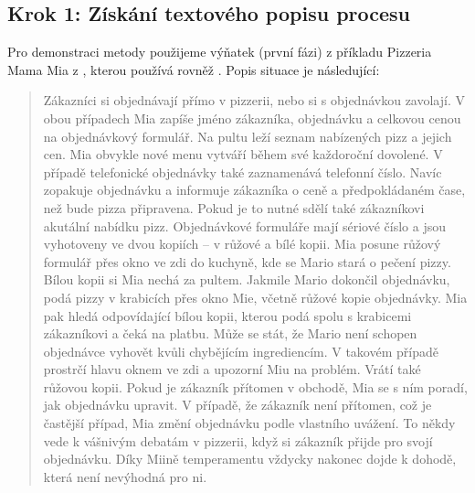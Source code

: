 \documentclass[]{article}
\begin{document}
\subsection{Krok 1: Získání textového popisu procesu}
Pro demonstraci metody použijeme výňatek (první fázi) z příkladu Pizzeria Mama Mia z \cite{Dietz2006}, kterou používá rovněž \cite{VanNuffel2009}. Popis situace je následující:
\begin{quote}
Zákazníci si objednávají přímo v pizzerii, nebo si s objednávkou zavolají. V obou případech Mia zapíše jméno zákazníka, objednávku a celkovou cenou na objednávkový formulář. Na pultu leží seznam nabízených pizz a jejich cen. Mia obvykle nové menu vytváří během své každoroční dovolené. V případě telefonické objednávky také zaznamenává telefonní číslo. Navíc zopakuje objednávku a informuje zákazníka o ceně a předpokládaném čase, než bude pizza připravena. Pokud je to nutné sdělí také zákazníkovi akutální nabídku pizz. Objednávkové formuláře mají sériové číslo a jsou vyhotoveny ve dvou kopiích – v růžové a bílé kopii. Mia posune růžový formulář přes okno ve zdi do kuchyně, kde se Mario stará o pečení pizzy. Bílou kopii si Mia nechá za pultem. Jakmile Mario dokončil objednávku, podá pizzy v krabicích přes okno Mie, včetně růžové kopie objednávky. Mia pak hledá odpovídající bílou kopii, kterou podá spolu s krabicemi zákazníkovi a čeká na platbu. Může se stát, že Mario není schopen objednávce vyhovět kvůli chybějícím ingrediencím. V takovém případě prostrčí hlavu oknem ve zdi a upozorní Miu na problém. Vrátí také růžovou kopii. Pokud je zákazník přítomen v obchodě, Mia se s ním poradí, jak objednávku upravit. V případě, že zákazník není přítomen, což je častější případ, Mia změní objednávku podle vlastního uvážení. To někdy vede k vášnivým debatám v pizzerii, když si zákazník přijde pro svojí objednávku. Díky Miině temperamentu vždycky nakonec dojde k dohodě, která není nevýhodná pro ni.

\end{quote}
\end{document}
